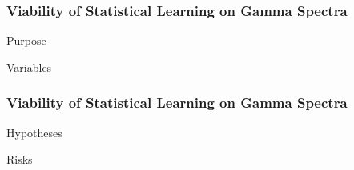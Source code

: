 
\begin{frame}
  \frametitle{Viability of Statistical Learning on Gamma Spectra}
  Purpose

  Variables
\end{frame}

\begin{frame}
  \frametitle{Viability of Statistical Learning on Gamma Spectra}
  Hypotheses

  Risks
\end{frame}

